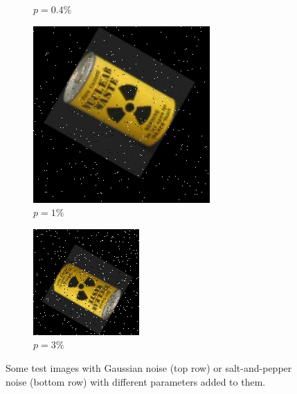 \begin{figure}[tbp]
\begin{subfigure}{0.329\textwidth}
	\caption{$p = 0.4\%$}
    \end{subfigure}
    \begin{subfigure}{0.329\textwidth}
        \centering
    \includegraphics[width=\textwidth]{figures/noise/pepper1.png}
	\caption{$p = 1\%$}
    \end{subfigure}
    \begin{subfigure}{0.329\textwidth}
        \centering
    \includegraphics[width=\textwidth]{figures/noise/pepper3.png}
	\caption{$p = 3\%$}
	\end{subfigure}
	\caption{Some test images with Gaussian noise (top row) or salt-and-pepper noise (bottom row) with different parameters added to them.}
	\label{fig:noise}
\end{figure}

